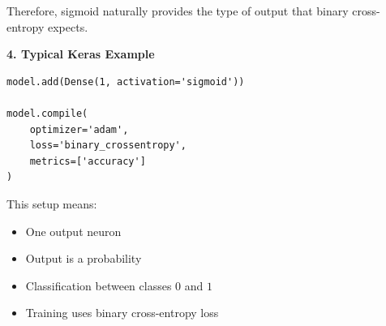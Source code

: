 \documentclass[conference]{IEEEtran}
\begin{document}
Therefore, sigmoid naturally provides the type of output that binary cross-entropy expects.

\bigskip

\textbf{4. Typical Keras Example}

\begin{verbatim}
model.add(Dense(1, activation='sigmoid'))

model.compile(
    optimizer='adam',
    loss='binary_crossentropy',
    metrics=['accuracy']
)
\end{verbatim}

This setup means:

\begin{itemize}
    \item One output neuron
    \item Output is a probability
    \item Classification between classes \(0\) and \(1\)
    \item Training uses binary cross-entropy loss
\end{itemize}
\end{document}
